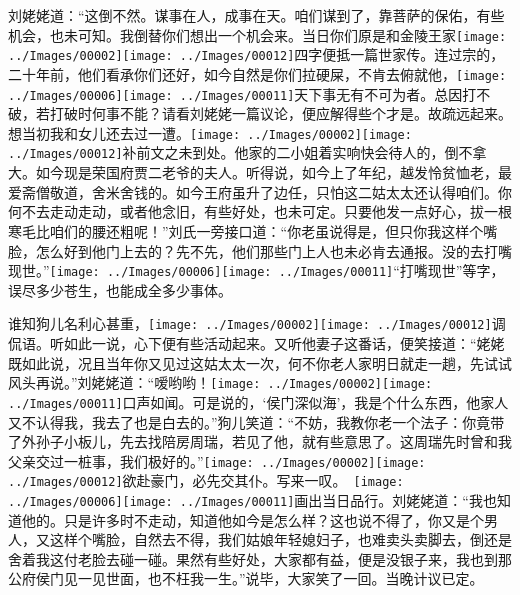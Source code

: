 刘姥姥道：``这倒不然。谋事在人，成事在天。咱们谋到了，靠菩萨的保佑，有些机会，也未可知。我倒替你们想出一个机会来。当日你们原是和金陵王家{\texttt{[image: ../Images/00002]}\texttt{[image: ../Images/00012]}\footnotesize \kaishu 四字便抵一篇世家传。}连过宗的，二十年前，他们看承你们还好，如今自然是你们拉硬屎，不肯去俯就他，{\texttt{[image: ../Images/00006]}\texttt{[image: ../Images/00011]}\footnotesize \kaishu 天下事无有不可为者。总因打不破，若打破时何事不能？请看刘姥姥一篇议论，便应解得些个才是。}故疏远起来。想当初我和女儿还去过一遭。{\texttt{[image: ../Images/00002]}\texttt{[image: ../Images/00012]}\footnotesize \kaishu 补前文之未到处。}他家的二小姐着实响快会待人的，倒不拿大。如今现是荣国府贾二老爷的夫人。听得说，如今上了年纪，越发怜贫恤老，最爱斋僧敬道，舍米舍钱的。如今王府虽升了边任，只怕这二姑太太还认得咱们。你何不去走动走动，或者他念旧，有些好处，也未可定。只要他发一点好心，拔一根寒毛比咱们的腰还粗呢！''刘氏一旁接口道：``你老虽说得是，但只你我这样个嘴脸，怎么好到他门上去的？先不先，他们那些门上人也未必肯去通报。没的去打嘴现世。''{\texttt{[image: ../Images/00006]}\texttt{[image: ../Images/00011]}\footnotesize \kaishu ``打嘴现世''等字，误尽多少苍生，也能成全多少事体。}

谁知狗儿名利心甚重，{\texttt{[image: ../Images/00002]}\texttt{[image: ../Images/00012]}\footnotesize \kaishu 调侃语。}听如此一说，心下便有些活动起来。又听他妻子这番话，便笑接道：``姥姥既如此说，况且当年你又见过这姑太太一次，何不你老人家明日就走一趟，先试试风头再说。''刘姥姥道：``嗳哟哟！{\texttt{[image: ../Images/00002]}\texttt{[image: ../Images/00011]}\footnotesize \kaishu 口声如闻。}可是说的，`侯门深似海'，我是个什么东西，他家人又不认得我，我去了也是白去的。''狗儿笑道：``不妨，我教你老一个法子：你竟带了外孙子小板儿，先去找陪房周瑞，若见了他，就有些意思了。这周瑞先时曾和我父亲交过一桩事，我们极好的。''{{\texttt{[image: ../Images/00002]}\texttt{[image: ../Images/00012]}\footnotesize \kaishu 欲赴豪门，必先交其仆。写来一叹。　}\texttt{[image: ../Images/00006]}\texttt{[image: ../Images/00011]}\footnotesize \kaishu 画出当日品行。}刘姥姥道：``我也知道他的。只是许多时不走动，知道他如今是怎么样？这也说不得了，你又是个男人，又这样个嘴脸，自然去不得，我们姑娘年轻媳妇子，也难卖头卖脚去，倒还是舍着我这付老脸去碰一碰。果然有些好处，大家都有益，便是没银子来，我也到那公府侯门见一见世面，也不枉我一生。''说毕，大家笑了一回。当晚计议已定。

